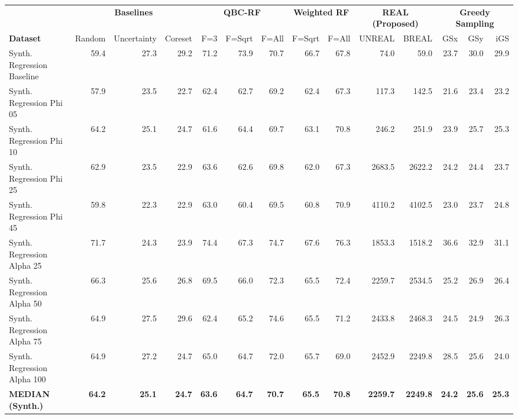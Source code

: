 \begin{table}[htbp]
    \centering
    \scriptsize
    \setlength{\tabcolsep}{4pt}
    \begin{tabular}{l rrrrrrrrrrrrr}
        \toprule
         & \multicolumn{3}{c}{\textbf{Baselines}} & \multicolumn{3}{c}{\textbf{QBC-RF}} & \multicolumn{2}{c}{\textbf{Weighted RF}} & \multicolumn{2}{c}{\textbf{REAL (Proposed)}} & \multicolumn{3}{c}{\textbf{Greedy Sampling}} \\
         \cmidrule(lr){2-4} \cmidrule(lr){5-7} \cmidrule(lr){8-9} \cmidrule(lr){10-11} \cmidrule(lr){12-14}
        \textbf{Dataset} & Random & Uncertainty & Coreset & F=3 & F=Sqrt & F=All & F=Sqrt & F=All & UNREAL & BREAL & GSx & GSy & iGS \\ \midrule
        Synth. Regression Baseline & 59.4 & 27.3 & 29.2 & 71.2 & 73.9 & 70.7 & 66.7 & 67.8 & 74.0 & 59.0 & 23.7 & 30.0 & 29.9 \\
        Synth. Regression Phi 05 & 57.9 & 23.5 & 22.7 & 62.4 & 62.7 & 69.2 & 62.4 & 67.3 & 117.3 & 142.5 & 21.6 & 23.4 & 23.2 \\
        Synth. Regression Phi 10 & 64.2 & 25.1 & 24.7 & 61.6 & 64.4 & 69.7 & 63.1 & 70.8 & 246.2 & 251.9 & 23.9 & 25.7 & 25.3 \\
        Synth. Regression Phi 25 & 62.9 & 23.5 & 22.9 & 63.6 & 62.6 & 69.8 & 62.0 & 67.3 & 2683.5 & 2622.2 & 24.2 & 24.4 & 23.7 \\
        Synth. Regression Phi 45 & 59.8 & 22.3 & 22.9 & 63.0 & 60.4 & 69.5 & 60.8 & 70.9 & 4110.2 & 4102.5 & 23.0 & 23.7 & 24.8 \\
        Synth. Regression Alpha 25 & 71.7 & 24.3 & 23.9 & 74.4 & 67.3 & 74.7 & 67.6 & 76.3 & 1853.3 & 1518.2 & 36.6 & 32.9 & 31.1 \\
        Synth. Regression Alpha 50 & 66.3 & 25.6 & 26.8 & 69.5 & 66.0 & 72.3 & 65.5 & 72.4 & 2259.7 & 2534.5 & 25.2 & 26.9 & 26.4 \\
        Synth. Regression Alpha 75 & 64.9 & 27.5 & 29.6 & 62.4 & 65.2 & 74.6 & 65.5 & 71.2 & 2433.8 & 2468.3 & 24.5 & 24.9 & 26.3 \\
        Synth. Regression Alpha 100 & 64.9 & 27.2 & 24.7 & 65.0 & 64.7 & 72.0 & 65.7 & 69.0 & 2452.9 & 2249.8 & 28.5 & 25.6 & 24.0 \\
        \midrule
        \textbf{MEDIAN (Synth.)} & \textbf{64.2} & \textbf{25.1} & \textbf{24.7} & \textbf{63.6} & \textbf{64.7} & \textbf{70.7} & \textbf{65.5} & \textbf{70.8} & \textbf{2259.7} & \textbf{2249.8} & \textbf{24.2} & \textbf{25.6} & \textbf{25.3} \\

\end{tabular}
\end{table}
